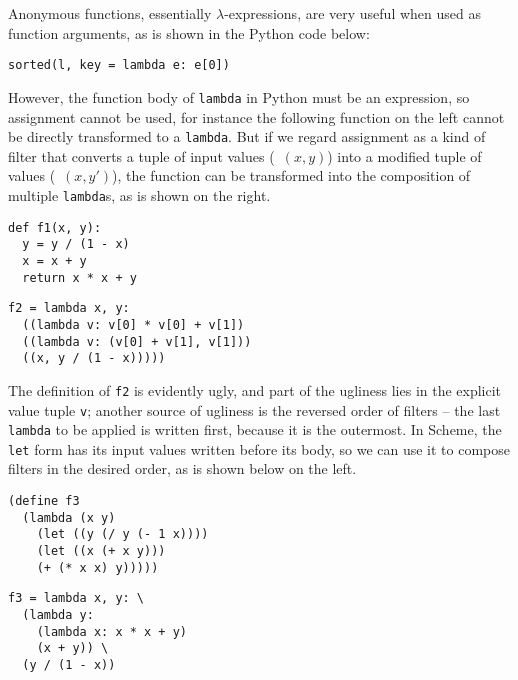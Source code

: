 Anonymous functions, essentially $\lambda$-expressions, are very useful
when used as function arguments, as is shown in the Python code below:
\begin{wquoting}
\begin{Verbatim}
sorted(l, key = lambda e: e[0])
\end{Verbatim}
\end{wquoting}
However, the function body of \verb|lambda| in Python must be an expression,
so assignment cannot be used, for instance the following function on the left
cannot be directly transformed to a \verb|lambda|.  But if we regard assignment
as a kind of filter that converts a tuple of input values (\eg~$(x, y)$) into
a modified tuple of values (\eg~$(x, y')$), the function can be transformed
into the composition of multiple \verb|lambda|s, as is shown on the right.
\colskipa\begin{multicols}{2}
\begin{wquoting}
\begin{Verbatim}
def f1(x, y):
  y = y / (1 - x)
  x = x + y
  return x * x + y
\end{Verbatim}
\end{wquoting}
\begin{wquoting}
\begin{Verbatim}
f2 = lambda x, y:
  ((lambda v: v[0] * v[0] + v[1])
  ((lambda v: (v[0] + v[1], v[1]))
  ((x, y / (1 - x)))))
\end{Verbatim}
\end{wquoting}
\end{multicols}\colskipb\noindent%
The definition of \verb|f2| is evidently ugly, and part of the ugliness
lies in the explicit value tuple \verb|v|; another source of ugliness is the
reversed order of filters -- the last \verb|lambda| to be applied is written
first, because it is the outermost.  In Scheme, the \verb|let| form has
its input values written before its body, so we can use it to compose
filters in the desired order, as is shown below on the left.
\colskipa\begin{multicols}{2}
\begin{wquoting}
\begin{Verbatim}
(define f3
  (lambda (x y)
    (let ((y (/ y (- 1 x))))
    (let ((x (+ x y)))
    (+ (* x x) y)))))
\end{Verbatim}
\end{wquoting}
\begin{wquoting}
\begin{Verbatim}
f3 = lambda x, y: \
  (lambda y:
    (lambda x: x * x + y)
    (x + y)) \
  (y / (1 - x))
\end{Verbatim}
\end{wquoting}
\end{multicols}\colskipb\noindent%
